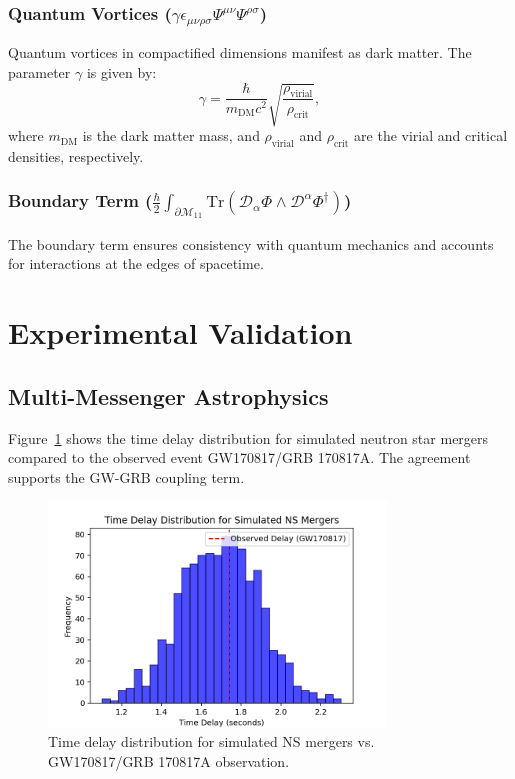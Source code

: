 \documentclass[12pt, a4paper]{article}
\begin{document}
\subsubsection{Quantum Vortices ($\gamma \epsilon_{\mu\nu\rho\sigma} \Psi^{\mu\nu} \Psi^{\rho\sigma}$)}
Quantum vortices in compactified dimensions manifest as dark matter. The parameter \(\gamma\) is given by:
\[
\gamma = \frac{\hbar}{m_{\text{DM}} c^2} \sqrt{\frac{\rho_{\text{virial}}}{\rho_{\text{crit}}}},
\]
where \(m_{\text{DM}}\) is the dark matter mass, and \(\rho_{\text{virial}}\) and \(\rho_{\text{crit}}\) are the virial and critical densities, respectively.

\subsubsection{Boundary Term ($\frac{\hbar}{2} \int_{\partial\mathcal{M}_{11}} \text{Tr}\left( \mathcal{D}_\alpha \Phi \wedge \mathcal{D}^\alpha \Phi^\dagger \right)$)}
The boundary term ensures consistency with quantum mechanics and accounts for interactions at the edges of spacetime.

\section{Experimental Validation}
\subsection{Multi-Messenger Astrophysics}
Figure~\ref{fig:gw_grb_delay} shows the time delay distribution for simulated neutron star mergers compared to the observed event GW170817/GRB 170817A. The agreement supports the GW-GRB coupling term. \\
\begin{figure}[H]
\centering
\includegraphics[width=0.8\textwidth]{gw_grb_delay.png}
\caption{Time delay distribution for simulated NS mergers vs. GW170817/GRB 170817A observation.}
\label{fig:gw_grb_delay}
\end{figure}
\end{document}
